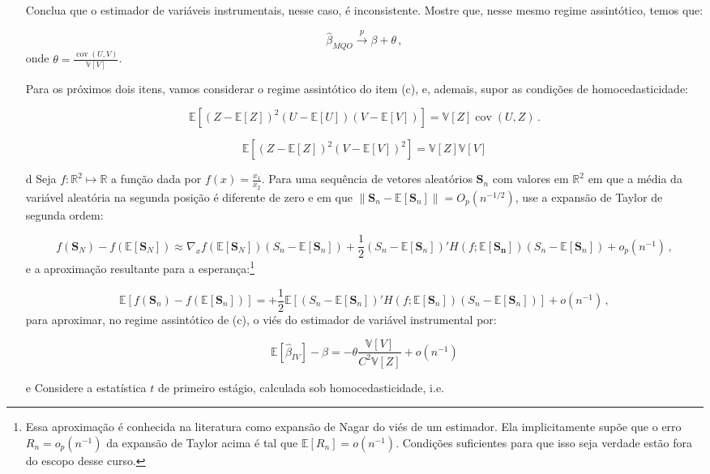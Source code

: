 \documentclass[10pt,a4paper]{article}
\begin{document}
\begin{itemize}
	Conclua que o estimador de variáveis instrumentais, nesse caso, é inconsistente. Mostre que, nesse mesmo regime assintótico, temos que:
	
	$$\hat \beta_{MQO}\overset{p}{\to} \beta + \theta\, ,$$
	onde $\theta = \frac{\operatorname{cov}(U,V)}{\mathbb{V}[V]}$.
	
	\vspace{0.5em}
	Para os próximos dois itens, vamos considerar o regime assintótico do item (c), e, ademais, supor as condições de homocedasticidade:
	
$$\mathbb{E}[(Z-\mathbb{E}[Z])^2 (U  - \mathbb{E}[U])(V-\mathbb{E}[V])]  = \mathbb{V}[Z]\operatorname{cov}(U,Z)\, .$$

$$\mathbb{E}[(Z-\mathbb{E}[Z])^2 (V-\mathbb{E}[V])^2] = \mathbb{V}[Z]\mathbb{V}[V]$$
		
	\item[d] 	Seja $f:\mathbb{R}^2 \mapsto \mathbb{R}$ a função dada por $f(x) = \frac{x_1}{x_2}$. Para uma sequência de vetores aleatórios $\boldsymbol{S}_n$  com valores em $\mathbb{R}^2$ em que a média da variável aleatória na segunda posição é diferente de zero e em que $\lVert \boldsymbol{S}_n - \mathbb{E}[\boldsymbol{S}_n] \rVert = O_p(n^{-1/2})$, use a expansão de Taylor de segunda ordem:
	
	$$f(\boldsymbol{S}_N) - f(\mathbb{E}[\boldsymbol{S}_N]) \approx \nabla_x f(\mathbb{E}[\boldsymbol{S}_N])(S_n -\mathbb{E}[\boldsymbol{S}_n]) + \frac{1}{2} (S_n -\mathbb{E}[\boldsymbol{S}_n])' H(f;\mathbb{E}[\boldsymbol{S_n}]) (S_n -\mathbb{E}[\boldsymbol{S}_n]) + o_p(n^{-1})\, ,$$
	e a aproximação resultante para a esperança:\footnote{Essa aproximação é conhecida na literatura como expansão de Nagar do viés de um estimador. Ela implicitamente supõe que o erro $R_n = o_p(n^{-1})$ da expansão de Taylor acima é tal que $\mathbb{E}[R_n] = o(n^{-1})$. Condições suficientes para que isso seja verdade estão fora do escopo desse curso. }
	
	$$\mathbb{E}[f(\boldsymbol{S}_n) - f(\mathbb{E}[\boldsymbol{S}_n])] =  + \frac{1}{2} \mathbb{E}[(S_n -\mathbb{E}[\boldsymbol{S}_n])' H(f;\mathbb{E}[\boldsymbol{S}_n]) (S_n -\mathbb{E}[\boldsymbol{S}_n]) ] + o(n^{-1})\, ,$$
	para aproximar, no regime assintótico de (c), o viés do estimador de variável instrumental por:
	
	$$\mathbb{E}[\hat{\beta}_{IV}] - \beta = -\theta \frac{\mathbb{V}[V]}{C^2\mathbb{V}[Z]} + o(n^{-1})$$
	
			\item[e] Considere a estatística $t$ de primeiro estágio, calculada sob homocedasticidade, i.e.
	

\end{itemize}
\end{document}
